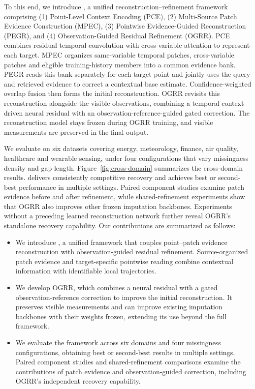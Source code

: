 To this end, we introduce \Model, a unified reconstruction--refinement framework comprising (1) Point-Level Context Encoding (PCE), (2) Multi-Source Patch Evidence Construction (MPEC), (3) Pointwise Evidence-Guided Reconstruction (PEGR), and (4) Observation-Guided Residual Refinement (OGRR). PCE combines residual temporal convolution with cross-variable attention to represent each target. MPEC organizes same-variable temporal patches, cross-variable patches and eligible training-history members into a common evidence bank. PEGR reads this bank separately for each target point and jointly uses the query and retrieved evidence to correct a contextual base estimate. Confidence-weighted overlap fusion then forms the initial reconstruction. OGRR revisits this reconstruction alongside the visible observations, combining a temporal-context-driven neural residual with an observation-reference-guided gated correction. The reconstruction model stays frozen during OGRR training, and visible measurements are preserved in the final output.

We evaluate \Model{} on six datasets covering energy, meteorology, finance, air quality, healthcare and wearable sensing, under four configurations that vary missingness density and gap length. Figure~\ref{fig:cross-domain} summarizes the cross-domain results. \Model{} delivers consistently competitive recovery and achieves best or second-best performance in multiple settings. Paired component studies examine patch evidence before and after refinement, while shared-refinement experiments show that OGRR also improves other frozen imputation backbones. Experiments without a preceding learned reconstruction network further reveal OGRR's standalone recovery capability. Our contributions are summarized as follows:
\begin{itemize}
 \item We introduce \Model, a unified framework that couples point--patch evidence reconstruction with observation-guided residual refinement. Source-organized patch evidence and target-specific pointwise reading combine contextual information with identifiable local trajectories.
 \item We develop OGRR, which combines a neural residual with a gated observation-reference correction to improve the initial reconstruction. It preserves visible measurements and can improve existing imputation backbones with their weights frozen, extending its use beyond the full framework.
 \item We evaluate the framework across six domains and four missingness configurations, obtaining best or second-best results in multiple settings. Paired component studies and shared-refinement comparisons examine the contributions of patch evidence and observation-guided correction, including OGRR's independent recovery capability.
\end{itemize}
